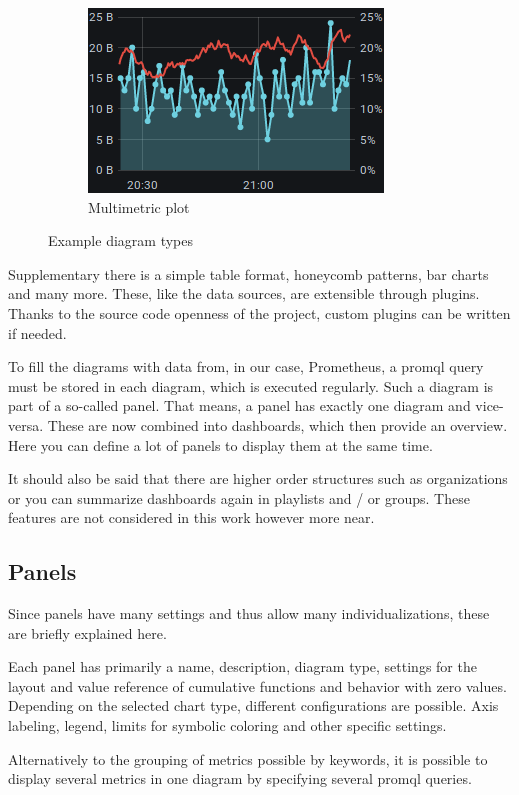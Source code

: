 \begin{figure}[ht]
\begin{subfigure}{.5\textwidth}
		\includegraphics[width=.8\linewidth]{assets/screenshots/Screenshot_2020-12-08 Grafana Play Home - Grafana(2).png}
		\captionsetup{justification=centering}
		\caption{Multimetric plot}
		\label{fig:sfig2}
	\end{subfigure}
	\caption{Example diagram types}
	\label{fig:fig}
\end{figure}
Supplementary there is a simple table format, honeycomb patterns, bar charts and many more. These, like the data sources, are extensible through plugins. Thanks to the source code openness of the project, custom plugins can be written if needed.

To fill the diagrams with data from, in our case, Prometheus, a \gls{promql} query must be stored in each diagram, which is executed regularly. Such a diagram is part of a so-called panel. That means, a panel has exactly one diagram and vice-versa. These are now combined into dashboards, which then provide an overview. Here you can define a lot of panels to display them at the same time.

It should also be said that there are higher order structures such as organizations or you can summarize dashboards again in playlists and / or groups. These features are not considered in this work however more near.

\subsection{Panels}
Since panels have many settings and thus allow many individualizations, these are briefly explained here.

Each panel has primarily a name, description, diagram type, settings for the layout and value reference of cumulative functions and behavior with zero values. Depending on the selected chart type, different configurations are possible. Axis labeling, legend, limits for symbolic coloring and other specific settings.

Alternatively to the grouping of metrics possible by keywords, it is possible to display several metrics in one diagram by specifying several \gls{promql} queries.


